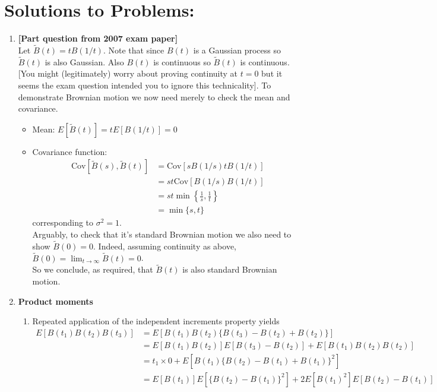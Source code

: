 \documentclass[11pt,a4paper]{article}
\begin{document}
  \section*{Solutions to Problems:}
  \begin{enumerate}
    \item \textbf{[Part question from 2007 exam paper]}\\
    Let $\tilde{B}(t) = tB(1/t)$. Note that since $B(t)$ is a Gaussian process so $\tilde{B}(t)$ is also Gaussian. Also $B(t)$ is continuous so $\tilde{B}(t)$ is continuous. [You might (legitimately) worry about proving continuity at $t = 0$ but it seems the exam question intended you to ignore this technicality]. To demonstrate Brownian motion we now need merely to check the mean and covariance.
    \begin{itemize}
      \item Mean: $E[\tilde{B}(t)] = tE[B(1/t)] = 0$
      \item Covariance function:
      \begin{align*}
        \text{Cov}[\tilde{B}(s), \tilde{B}(t)]
        &= \text{Cov}[sB(1/s)tB(1/t)]\\
        &= st\text{Cov}[B(1/s)B(1/t)]\\
        &= st\min\left\{\frac{1}{s}, \frac{1}{t}\right\}\\
        &= \min \{s,t\}
      \end{align*}
      corresponding to $\sigma^2 = 1$.\\
      Arguably, to check that it's standard Brownian motion we also need to show $\tilde{B}(0) = 0$. Indeed, assuming continuity as above, $\tilde{B}(0) = \lim_{t\to\infty} \tilde{B}(t) = 0$.\\
      So we conclude, as required, that $\tilde{B}(t)$ is also standard Brownian motion.
    \end{itemize}
    \item \textbf{Product moments}
    \begin{enumerate}
      \item Repeated application of the independent increments property yields
      \begin{align*}
        E[B(t_1)B(t_2)B(t_3)] 
        &= E[B(t_1)B(t_2)\{B(t_3) - B(t_2) + B(t_2)\}]\\
        &= E[B(t_1)B(t_2)]E[B(t_3) - B(t_2)] + E[B(t_1)B(t_2)B(t_2)]\\
        &= t_1\times 0 + E[B(t_1)\{B(t_2) - B(t_1) + B(t_1)\}^2]\\
        &= E[B(t_1)]E[\{B(t_2) - B(t_1)\}^2] + 2E[B(t_1)^2]E[B(t_2) - B(t_1)] \\

\end{align*}
\end{enumerate}
\end{enumerate}
\end{document}
